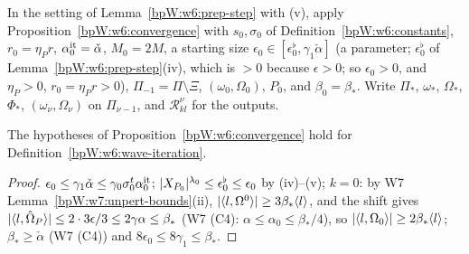 
\begin{definition}\label{bpW:w6:wave-iteration}
In the setting of Lemma~\ref{bpW:w6:prep-step} with (v), apply Proposition~\ref{bpW:w6:convergence} with $s_0,\sigma_0$ of
Definition~\ref{bpW:w6:constants}, $r_0=\eta_Pr$, $\alpha_0^{\rm it}=\check\alpha$, $M_0=2M$, a starting size
$\epsilon_0\in[\epsilon^\flat_0,\gamma_1\check\alpha]$ (a parameter; $\epsilon^\flat_0$ of Lemma~\ref{bpW:w6:prep-step}(iv), which is
$>0$ because $\epsilon>0$; so $\epsilon_0>0$, and $\eta_P>0$, $r_0=\eta_Pr>0$), $\Pi_{-1}=\Pi\setminus\Xi$,
$(\omega_0,\Omega_0)$, $P_0$, and $\beta_0=\beta_*$. Write $\Pi_*$, $\omega_*$, $\Omega_*$, $\Phi_*$, $(\omega_\nu,\Omega_\nu)$ on $\Pi_{\nu-1}$, and
$\mathcal R^\nu_{kl}$ for the outputs.
\end{definition}

\begin{lemma}[Applicability]\label{bpW:w6:applicable}
The hypotheses of Proposition~\ref{bpW:w6:convergence} hold for Definition~\ref{bpW:w6:wave-iteration}.
\end{lemma}
\begin{proof}
$\epsilon_0\le\gamma_1\check\alpha\le\gamma_0\sigma_0^t\alpha_0^{\rm it}$; $\lvert X_{P_0}\rvert^{\lambda_0}\le\epsilon^\flat_0\le\epsilon_0$ by (iv)--(v);
$k=0$: by W7 Lemma~\ref{bpW:w7:unpert-bounds}(ii), $\lvert \langle l,\Omega^0\rangle\rvert\ge3\beta_*\langle l\rangle$, and the shift gives
$\lvert \langle l,\hat\Omega_P\rangle\rvert\le2\cdot3\epsilon/3\le2\gamma\alpha\le\beta_*$ (W7 (C4): $\alpha\le\alpha_0\le\beta_*/4$), so
$\lvert \langle l,\Omega_0\rangle\rvert\ge2\beta_*\langle l\rangle$;
$\beta_*\ge\check\alpha$ (W7 (C4)) and $8\epsilon_0\le8\gamma_1\le\beta_*$.
\end{proof}

